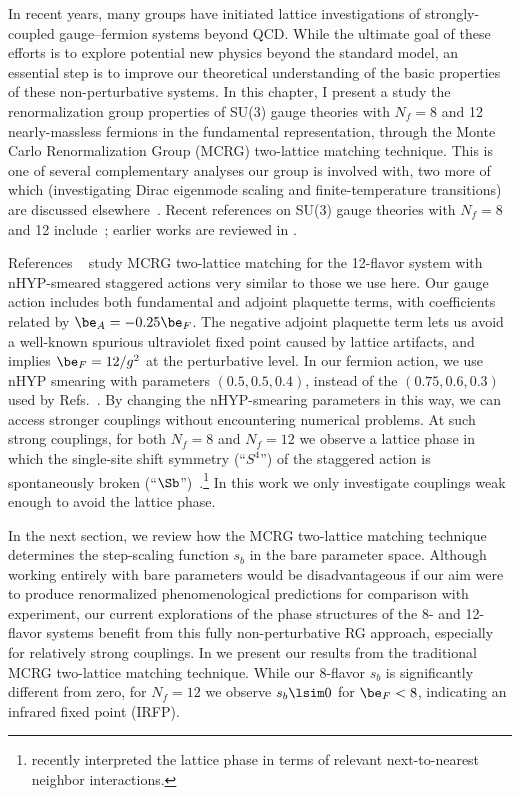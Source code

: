 
In recent years, many groups have initiated lattice investigations of strongly-coupled gauge--fermion systems beyond QCD.
While the ultimate goal of these efforts is to explore potential new physics beyond the standard model, an essential step is to improve our theoretical understanding of the basic properties of these non-perturbative systems.
In this chapter, I present a study the renormalization group properties of SU(3) gauge theories with $N_f = 8$ and 12 nearly-massless fermions in the fundamental representation, through the Monte Carlo Renormalization Group (MCRG) two-lattice matching technique.
This is one of several complementary analyses our group is involved with, two more of which (investigating Dirac eigenmode scaling and finite-temperature transitions) are discussed elsewhere~\cite{Hasenfratz:2012fp, Schaich:2012fr}.
Recent references on SU(3) gauge theories with $N_f = 8$ and 12 include~\cite{Fodor:2012uw, Fodor:2012et, Aoki:2012eq, Deuzeman:2012ee, Lin:2012iw}; earlier works are reviewed in .

References ~\cite{Hasenfratz:2011xn, Hasenfratz:2011np} study MCRG two-lattice matching for the 12-flavor system with nHYP-smeared staggered actions very similar to those we use here.
Our gauge action includes both fundamental and adjoint plaquette terms, with coefficients related by $\be_A = -0.25\be_F$.
The negative adjoint plaquette term lets us avoid a well-known spurious ultraviolet fixed point caused by lattice artifacts, and implies $\be_F = 12 / g^2$ at the perturbative level.
In our fermion action, we use nHYP smearing with parameters $(0.5, 0.5, 0.4)$, instead of the $(0.75, 0.6, 0.3)$ used by Refs.~\cite{Hasenfratz:2011xn, Hasenfratz:2011np}.
By changing the nHYP-smearing parameters in this way, we can access stronger couplings without encountering numerical problems.
At such strong couplings, for both $N_f = 8$ and $N_f = 12$ we observe a lattice phase in which the single-site shift symmetry (``$S^4$'') of the staggered action is spontaneously broken (``$\Sb$'')~\cite{Cheng:2011ic, Schaich:2012fr}.\footnote{ recently interpreted the \Sb lattice phase in terms of relevant next-to-nearest neighbor interactions.}
In this work we only investigate couplings weak enough to avoid the \Sb lattice phase.

In the next section, we review how the MCRG two-lattice matching technique determines the step-scaling function $s_b$ in the bare parameter space.
Although working entirely with bare parameters would be disadvantageous if our aim were to produce renormalized phenomenological predictions for comparison with experiment, our current explorations of the phase structures of the 8- and 12-flavor systems benefit from this fully non-perturbative RG approach, especially for relatively strong couplings.
In  we present our results from the traditional MCRG two-lattice matching technique.
While our 8-flavor $s_b$ is significantly different from zero, for $N_f = 12$ we observe $s_b \lsim 0$ for $\be_F < 8$, indicating an infrared fixed point (IRFP).

